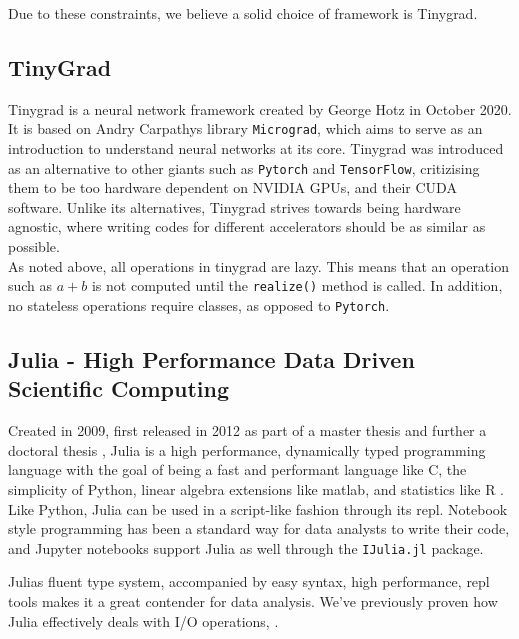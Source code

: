 Due to these constraints, we believe a solid choice of framework is Tinygrad.

\subsection{TinyGrad}

Tinygrad is a neural network framework created by George Hotz in October 2020. It is based on Andry Carpathys library \texttt{Micrograd}, which aims to serve as an introduction to understand neural networks at its core. Tinygrad was introduced as an alternative to other giants such as \texttt{Pytorch} and \texttt{TensorFlow}, critizising them to be too hardware dependent on NVIDIA GPUs, and their CUDA software. Unlike its alternatives, Tinygrad strives towards being hardware agnostic, where writing codes for different accelerators should be as similar as possible. \\

As noted above, all operations in tinygrad are lazy. This means that an operation such as $a+b$ is not computed until the \texttt{realize()} method is called. In addition, no stateless operations require classes, as opposed to \texttt{Pytorch}. \\









\subsection{Julia - High Performance Data Driven Scientific Computing}

Created in 2009, first released in 2012 as part of a master thesis \cite{juliaMs} and further a doctoral thesis \cite{juliaPHD}, Julia is a high performance, dynamically typed programming language with the goal of being a fast and performant language like C, the simplicity of Python, linear algebra extensions like matlab, and statistics like R \cite{julia}.  \\ 

Like Python, Julia can be used in a script-like fashion through its \acrfull{repl}. Notebook style programming has been a standard way for data analysts to write their code, and Jupyter notebooks support Julia as well through the \texttt{IJulia.jl} package. 

Julias fluent type system, accompanied by easy syntax, high performance, \acrshort{repl} tools makes it a great contender for data analysis. We've previously proven how Julia effectively deals with I/O operations, \cite{projthesis}.


